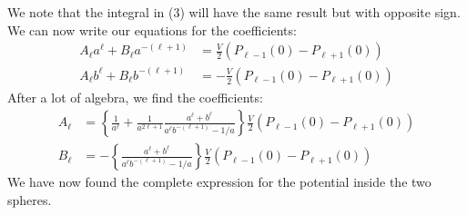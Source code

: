 \documentclass[a4paper,11pt]{article}
\numberwithin{equation}{section}
\newcommand{\lrb}[1]{\left\{{#1}\right\}}
\begin{document}
We note that the integral in (3) will have the same result but with opposite sign. 
We can now write our equations for the coefficients:
\begin{align}
 A_\ell a^\ell + B_\ell a^{-(\ell+1)} &= \frac{V}{2} (P_{\ell-1}(0)-P_{\ell+1}(0))\\
 A_\ell b^\ell + B_\ell b^{-(\ell+1)} &= -\frac{V}{2} (P_{\ell-1}(0)-P_{\ell+1}(0))
\end{align}
After a lot of algebra, we find the coefficients:
\begin{align}
 A_\ell &= \lrb{\frac{1}{a^\ell}+\frac{1}{a^{2\ell+1}} \frac{a^\ell+b^\ell}{a^\ell b^{-(\ell+1)}-1/a}}
	    \frac{V}{2} (P_{\ell-1}(0)-P_{\ell+1}(0))\\
 B_\ell &= -\lrb{ \frac{a^\ell+b^\ell}{a^\ell b^{-(\ell+1)}-1/a} } \frac{V}{2} (P_{\ell-1}(0)-P_{\ell+1}(0))
\end{align}
We have now found the complete expression for the potential inside the two spheres.
\end{document}
